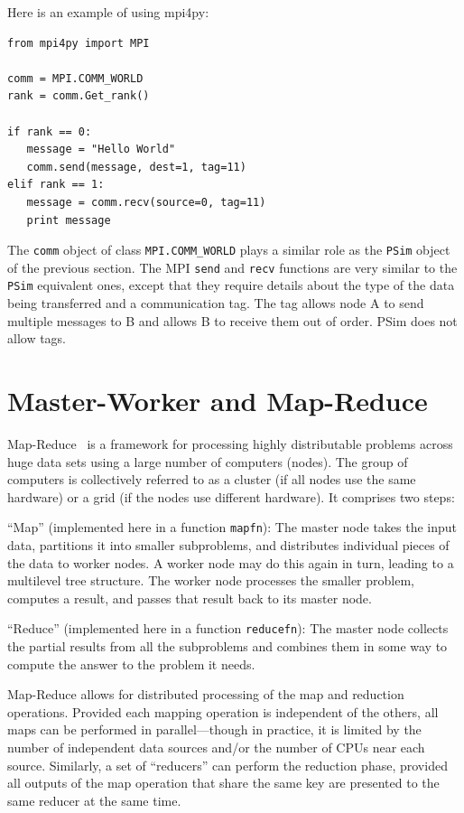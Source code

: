 \documentclass[justified,sixbynine]{tufte-book}
\def\ft{\small\tt}
\theoremstyle{plain}%
\theoremstyle{definition}
\theoremstyle{remark}
\begin{document}
\begin{fullwidth}
Here is an example of using mpi4py:

\begin{lstlisting}
from mpi4py import MPI

comm = MPI.COMM_WORLD
rank = comm.Get_rank()

if rank == 0:
   message = "Hello World"
   comm.send(message, dest=1, tag=11)
elif rank == 1:
   message = comm.recv(source=0, tag=11)
   print message
\end{lstlisting}

The {\ft comm} object of class {\ft MPI.COMM\_WORLD} plays a similar role as the {\ft PSim} object of the previous section. The MPI {\ft send} and {\ft recv} functions are very similar to the {\ft PSim} equivalent ones, except that they require details about the type of the data being transferred and a communication tag. The tag allows node A to send multiple messages to B and allows B to receive them out of order. PSim does not allow tags.

\goodbreak\section{Master-Worker and Map-Reduce}

Map-Reduce~\cite{mapreduce} is a framework for processing highly distributable problems across huge data sets using a large number of computers (nodes). The group of computers is collectively referred to as a cluster (if all nodes use the same hardware) or a grid (if the nodes use different hardware). It comprises two steps:

``Map'' (implemented here in a function {\ft mapfn}): The master node takes the input data, partitions it into smaller subproblems, and distributes individual pieces of the data to worker nodes. A worker node may do this again in turn, leading to a multilevel tree structure. The worker node processes the smaller problem, computes a result, and passes that result back to its master node.

``Reduce'' (implemented here in a function {\ft reducefn}): The master node collects the partial results from all the subproblems and combines them in some way to compute the answer to the problem it needs.

Map-Reduce allows for distributed processing of the map and reduction operations. Provided each mapping operation is independent of the others, all maps can be performed in parallel---though in practice, it is limited by the number of independent data sources and/or the number of CPUs near each source. Similarly, a set of ``reducers'' can perform the reduction phase, provided all outputs of the map operation that share the same key are presented to the same reducer at the same time.


\end{fullwidth}
\end{document}
